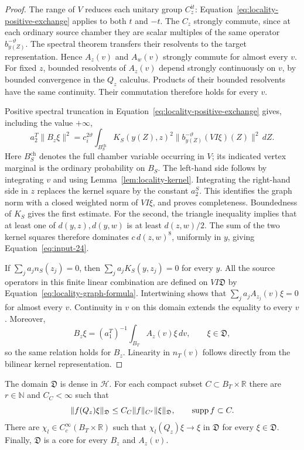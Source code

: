 \begin{proof}
The range of $V$ reduces each unitary group $C_z^{\mathrm i t}$:
Equation~\eqref{eq:locality-positive-exchange} applies to both $t$ and
$-t$.  The $C_z$ strongly commute, since at each ordinary source
chamber they are scalar multiples of the same operator
$b_{y(Z)}^{-\vartheta}$.  The spectral theorem transfers their
resolvents to the target representation.  Hence $A_z(v)$ and $A_w(v)$
strongly commute for almost every $v$.  For fixed $z$, bounded
resolvents of $A_z(v)$ depend strongly continuously on $v$, by bounded
convergence in the $Q_z$ calculus.  Products of their bounded
resolvents have the same continuity.  Their commutation therefore
holds for every $v$.

Positive spectral truncation in
Equation~\eqref{eq:locality-positive-exchange} gives, including the
value $+\infty$,
\begin{equation}
 a_2^T\|B_z\xi\|^2
 =c_i^{2\vartheta}\int_{B_S^{\mathrm{ch}}}
 K_S(y(Z),z)^2
 \big\|b_{y(Z)}^{-\vartheta}(VI\xi)(Z)\big\|^2\,dZ.
 \label{eq:locality-graph-formula}
\end{equation}
Here $B_S^{\mathrm{ch}}$ denotes the full chamber variable occurring
in $V$; its indicated vertex marginal is the ordinary probability
on $B_S$.  The left-hand side follows by integrating $v$ and using
Lemma~\ref{lem:locality-kernel}.  Integrating the right-hand side in
$z$ replaces the kernel square by the constant $a_2^S$.  This
identifies the graph norm with a closed weighted norm of $VI\xi$,
and proves completeness.  Boundedness of $K_S$ gives the first
estimate.  For the second, the triangle inequality implies that at
least one of $d(y,z),d(y,w)$ is at least $d(z,w)/2$.  The sum of the
two kernel squares therefore dominates $c\,d(z,w)^8$, uniformly in
$y$, giving Equation~\eqref{eq:input-24}.

If $\sum_j a_j n_S(z_j)=0$, then
$\sum_j a_jK_S(y,z_j)=0$ for every $y$.  All the source operators in
this finite linear combination are defined on $VI\mathfrak D$ by
Equation~\eqref{eq:locality-graph-formula}.  Intertwining shows that
$\sum_j a_jA_{z_j}(v)\xi=0$ for almost every $v$.  Continuity in $v$
on this domain extends the equality to every $v$.  Moreover,
\[
 B_z\xi=(a_1^T)^{-1}\int_{B_T}A_z(v)\xi\,dv,
 \qquad \xi\in\mathfrak D,
\]
so the same relation holds for $B_z$.  Linearity in $n_T(v)$ follows
directly from the bilinear kernel representation.
\end{proof}

\begin{lemma}
\label{lem:locality-cores}
The domain $\mathfrak D$ is dense in $\mathcal H$.  For each compact
subset $C\subset B_T\times\mathbb R$ there are $r\in\mathbb N$ and
$C_C<\infty$ such that
\[
 \|f(Q_z)\xi\|_{\mathfrak D}
 \le C_C\|f\|_{C^r}\|\xi\|_{\mathfrak D},
 \qquad \operatorname{supp} f\subset C.
\]
There are $\chi_l\in C_c^\infty(B_T\times\mathbb R)$ such that
$\chi_l(Q_z)\xi\to\xi$ in $\mathfrak D$ for every
$\xi\in\mathfrak D$.  Finally, $\mathfrak D$ is a core for every
$B_z$ and $A_z(v)$.
\end{lemma}

